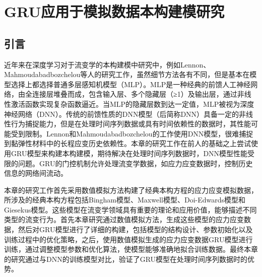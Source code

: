 \chapter{GRU应用于模拟数据本构建模研究}
\section{引言}
近年来在深度学习对于流变学的本构建模中研究中，例如Lennon、Mahmoudabadbozchelou等人的研究工作，虽然细节方法各有不同，但是基本在模型选择上都选择普通多层感知机模型（MLP）\cite{lennonScientificMachineLearning2023a,mahmoudabadbozchelouDatadrivenPhysicsinformedConstitutive2021}。MLP是一种经典的前馈人工神经网络，由全连接层堆叠而成，包含输入层、多个隐藏层（≥1）及输出层，通过非线性激活函数实现复杂函数逼近。当MLP的隐藏层数到达一定值，MLP被视为深度神经网络（DNN）。传统的前馈性质的DNN模型（后简称DNN）具备一定的非线性行为捕捉能力，但是在处理时间序列数据或具有时间依赖性的数据时，其性能可能受到限制。Lennon和Mahmoudabadbozchelou的工作使用DNN模型，很难捕捉到黏弹性材料中的长程应变历史依赖性。本章的研究工作在前人的基础之上尝试使用GRU模型来构建本构建模，期待解决在处理时间序列数据时，DNN模型性能受限的问题。GRU的门控机制允许处理流变学数据，如应力应变数据时，控制历史信息的网络间流动。

本章的研究工作首先采用数值模拟方法构建了经典本构方程的应力应变模拟数据，所涉及的经典本构方程包括Bingham模型、Maxwell模型、Doi-Edwards模型和Giesekus模型。这些模型在流变学领域具有重要的理论和应用价值，能够描述不同类型的流变行为。首先本章研究通过数值模拟方法，生成这些模型的应力应变数据，然后对GRU模型进行了详细的构建，包括模型的结构设计、参数初始化以及训练过程中的优化策略，之后，使用数值模拟生成的应力应变数据GRU模型进行训练，通过调整模型参数和优化算法，使模型能够准确地拟合训练数据。最终本章的研究通过与DNN的训练模型对比，验证了GRU模型在处理时间序列数据时的优势。
